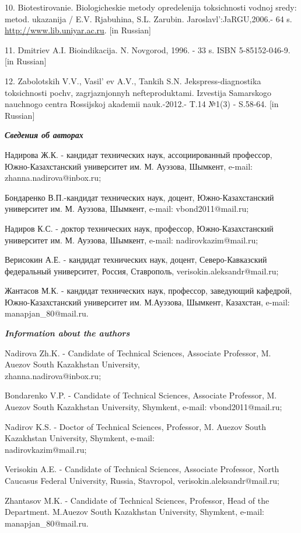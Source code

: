 \begin{refs}
10. Biotestirovanie. Biologicheskie metody opredelenija toksichnosti
vodnoj sredy: metod. ukazanija / E.V. Rjabuhina, S.L. Zarubin.
Jaroslavl':JaRGU,2006.- 64 s.
\href{http://www.lib.uniyar.ac.ru/edocs/iuni/20220301.pdf}{http://www.lib.uniyar.ac.ru}. {[}in Russian{]}

11. Dmitriev A.I. Bioindikacija. N. Novgorod, 1996. - 33 s. ISBN
5-85152-046-9. {[}in Russian{]}

12. Zabolotskih V.V., Vasil' ev A.V., Tankih S.N.
Jekspress-diagnostika toksichnosti pochv, zagrjaznjonnyh
nefteproduktami. Izvestija Samarskogo nauchnogo centra Rossijskoj
akademii nauk.-2012.- T.14 №1(3) - S.58-64. {[}in Russian{]}
\end{refs}

\begin{info}
\emph{{\bfseries Сведения об авторах}}

Надирова Ж.К. - кандидат технических наук, ассоциированный
профессор, Южно-Казахстанский университет им. М. Ауэзова, Шымкент,
e-mail:
zhanna.nadirova@inbox.ru;

Бондаренко В.П.-кандидат технических наук, доцент,
Южно-Казахстанский университет им. М. Ауэзова, Шымкент, e-mail:
vbond2011@mail.ru;

Надиров К.С. - доктор технических наук, профессор, Южно-Казахстанский
университет им. М. Ауэзова, Шымкент, e-mail:
nadirovkazim@mail.ru;

Верисокин А.Е. - кандидат технических наук, доцент, Северо-Кавказский
федеральный университет, Россия, Ставрополь, verisokin.aleksandr@mail.ru; 

Жантасов М.К. - кандидат технических наук, профессор, заведующий
кафедрой, Южно-Казахстанский университет им. М.Ауэзова, Шымкент,
Казахстан, e-mail: manapjan\_80@mail.ru.

\emph{{\bfseries Information about the authors}}

Nadirova Zh.K. - Candidate of Technical Sciences, Associate Professor,
M. Auezov South Kazakhstan University,\\
zhanna.nadirova@inbox.ru;

Bondarenko V.P. - Candidate of Technical Sciences, Associate Professor,
M. Auezov South Kazakhstan University, Shymkent, e-mail:
vbond2011@mail.ru;

Nadirov K.S. - Doctor of Technical Sciences, Professor, M. Auezov South
Kazakhstan University, Shymkent, e-mail:\\
nadirovkazim@mail.ru;

Verisokin A.E. - Candidate of Technical Sciences, Associate Professor,
North Caucasus Federal University, Russia, Stavropol,
verisokin.aleksandr@mail.ru;

Zhantasov M.K. - Candidate of Technical Sciences, Professor, Head of the
Department. M.Auezov South Kazakhstan University, Shymkent, e-mail:
manapjan\_80@mail.ru.
\end{info}
